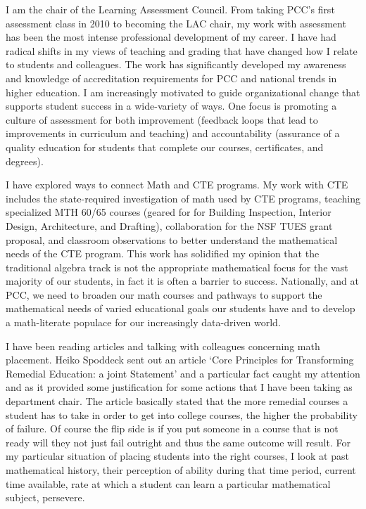\begin{description}[style=nextline]
	\item[Michele Marden (Full-time Instructor, Sylvania Campus)]
	I am the chair of the Learning Assessment Council.  From taking PCC's first
	assessment class in 2010 to becoming the LAC chair, my work with assessment has
	been the most intense professional development of my career. I have had radical
	shifts in my views of teaching and grading that have changed how I relate to
	students and colleagues. The work has significantly developed my awareness and
	knowledge of accreditation requirements for PCC and national trends in higher
	education. I am increasingly motivated to guide organizational change that
	supports student success in a wide-variety of ways. One focus is promoting a
	culture of assessment for both improvement (feedback loops that lead to
	improvements in curriculum and teaching) and accountability (assurance of a
	quality education for students that complete our courses, certificates, and
	degrees).

	I have explored ways to connect Math and CTE programs.  My work with CTE
	includes the state-required investigation of math used by CTE programs,
	teaching specialized MTH 60/65 courses (geared for for Building Inspection,
	Interior Design, Architecture, and Drafting), collaboration for the NSF TUES
	grant proposal, and classroom observations to better understand the
	mathematical needs of the CTE program. This work has solidified my opinion that
	the traditional algebra track is not the appropriate mathematical focus for the
	vast majority of our students, in fact it is often a barrier to success.
	Nationally, and at PCC, we need to broaden our math courses and pathways to
	support the mathematical needs of varied educational goals our students have
	and to develop a math-literate populace for our increasingly data-driven world.

	\item[Henry Mesa (Faculty Chair, Rock Creek Campus)]
	I have been reading articles and talking with colleagues concerning math
	placement.  Heiko Spoddeck sent out an article `Core Principles for
	Transforming Remedial Education: a joint Statement'  and a particular fact
	caught my attention and as it provided some justification for some actions that
	I have been taking as department chair.  The article basically stated that the
	more remedial courses a student has to take in order to get into college
	courses, the higher the probability of failure.  Of course the flip side is if
	you put someone in a course that is not ready will they not just fail outright
	and thus the same outcome will result.   For my particular situation of placing
	students into the right courses, I look at past mathematical history, their
	perception of ability during that time period, current time available, rate at
	which a student can learn a particular mathematical subject, persevere.


\end{description}
